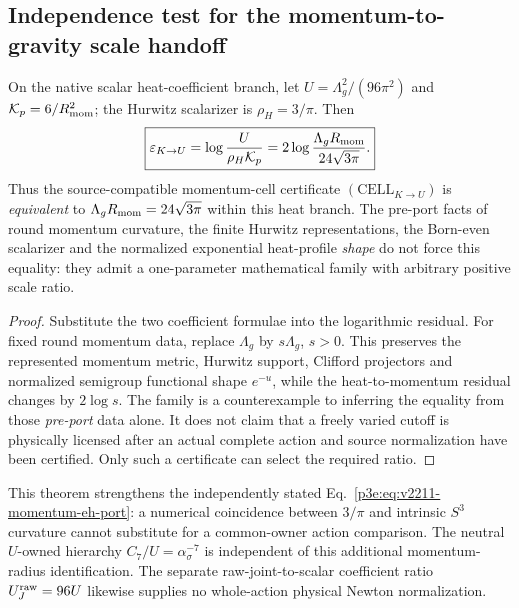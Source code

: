 \documentclass[12pt,a4paper]{article}
\begin{document}
\subsection{Independence test for the momentum-to-gravity scale handoff}
\label{p3e:sec:v346-cell-independence}
\begin{theorem}
\label{p3e:thm:v346-cell-scale-independence}
On the native scalar heat-coefficient branch, let
$U=\Lambda_g^2/(96\pi^2)$ and
$\mathcal K_p=6/R_{\rm mom}^2$; the Hurwitz scalarizer is
$\rho_H=3/\pi$.  Then
\[
 \boxed{\varepsilon_{K\to U}
 =\log\frac{U}{\rho_H\mathcal K_p}
 =2\log\frac{\Lambda_gR_{\rm mom}}{24\sqrt{3\pi}}.}
\]
Thus the source-compatible momentum-cell certificate
$(\mathrm{CELL}_{K\to U})$ is \emph{equivalent} to
$\Lambda_g R_{\rm mom}=24\sqrt{3\pi}$ within this heat branch.
The pre-port facts of round momentum curvature, the finite Hurwitz
representations, the Born-even scalarizer and the normalized exponential
heat-profile \emph{shape} do not force this equality: they admit a
one-parameter mathematical family with arbitrary positive scale ratio.
\end{theorem}
\begin{proof}
Substitute the two coefficient formulae into the logarithmic residual.
For fixed round momentum data, replace $\Lambda_g$ by
$s\Lambda_g$, $s>0$.  This preserves the represented momentum metric,
Hurwitz support, Clifford projectors and normalized semigroup functional
shape $e^{-u}$, while the heat-to-momentum residual changes by
$2\log s$.  The family is a counterexample to inferring the equality
from those \emph{pre-port} data alone.  It does not claim that a freely
varied cutoff is physically licensed after an actual complete action
and source normalization have been certified.  Only such a certificate
can select the required ratio.
\end{proof}
\begin{remark}
\label{p3e:rem:v346-cell-owner-status}
This theorem strengthens the independently stated
Eq.~\eqref{p3e:eq:v2211-momentum-eh-port}: a numerical coincidence
between $3/\pi$ and intrinsic $S^3$ curvature cannot substitute for a
common-owner action comparison.  The neutral $U$-owned hierarchy
$C_7/U=\alpha_\sigma^{-7}$ is independent of this additional
momentum-radius identification.  The separate raw-joint-to-scalar
coefficient ratio $U_J^{\rm raw}=96U$ likewise supplies no
whole-action physical Newton normalization.
\end{remark}
\end{document}
